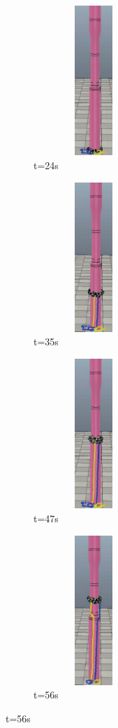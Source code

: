 \begin{figure}[htbp]
	\centering
	\begin{subfigure}{0.3\textwidth}{
			\centering
			\includegraphics[height=160pt,width=0.5\textwidth]{figure/chap05/BSB/34s.eps}
			\caption{t=24s}
		}
	\end{subfigure}
	\begin{subfigure}{0.3\textwidth}{
			\centering
			\includegraphics[height=160pt,width=0.5\textwidth]{figure/chap05/BSB/49s.eps}
			\caption{t=35s}
		}
	\end{subfigure}
	\begin{subfigure}{0.3\textwidth}{
			\centering
			\includegraphics[height=160pt,width=0.5\textwidth]{figure/chap05/BSB/1m05s.eps}
			\caption{t=47s}
		}
	\end{subfigure}
	\begin{subfigure}{0.3\textwidth}{
			\centering
			\includegraphics[height=160pt,width=0.5\textwidth]{figure/chap05/BSB/1m17s.eps}
			\caption{t=56s}
		}

\end{subfigure}
\end{figure}
